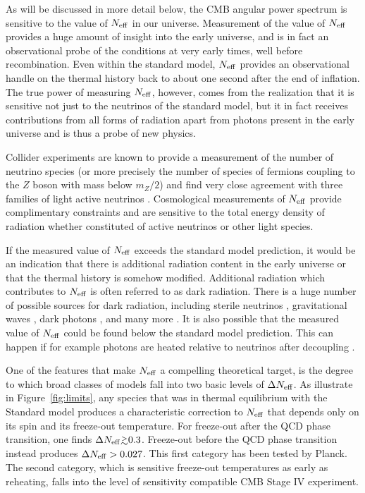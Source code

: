 As will be discussed in more detail below, the CMB angular power spectrum is sensitive to the value of $N_{\rm eff}$ in our universe.  Measurement of the value of $N_{\rm eff}$ provides a huge amount of insight into the early universe, and is in fact an observational probe of the conditions at very early times, well before recombination.  Even within the standard model, $N_{\rm eff}$ provides an observational handle on the thermal history back to about one second after the end of inflation.  The true power of measuring $N_{\rm eff}$, however, comes from the realization that it is sensitive not just to the neutrinos of the standard model, but it in fact receives contributions from all forms of radiation apart from photons present in the early universe and is thus a probe of new physics.

Collider experiments are known to provide a measurement of the number of neutrino species (or more precisely the number of species of fermions coupling to the $Z$ boson with mass below $m_Z/2$) and find very close agreement with three families of light active neutrinos \cite{ALEPH:2005ab}.  Cosmological measurements of $N_{\rm eff}$ provide complimentary constraints and are sensitive to the total energy density of radiation whether constituted of active neutrinos or other light species.

If the measured value of $N_{\rm eff}$ exceeds the standard model prediction, it would be an indication that there is additional radiation content in the early universe or that the thermal history is somehow modified.  Additional radiation which contributes to $N_{\rm eff}$ is often referred to as dark radiation.  There is a huge number of possible sources for dark radiation, including sterile neutrinos \cite{Abazajian:2001nj,Strumia:2006db,Boyarsky:2009ix}, gravitational waves \cite{Boyle:2007zx,Stewart:2007fu,Meerburg:2015zua}, dark photons \cite{Ackerman:mha,Kaplan:2011yj,CyrRacine:2012fz}, and many more \cite{Cadamuro:2010cz,Weinberg:2013kea}.  It is also possible that the measured value of $N_{\rm eff}$ could be found below the standard model prediction.  This can happen if for example photons are heated relative to neutrinos after decoupling \cite{Steigman:2013yua,Boehm:2013jpa}.

One of the features that make $N_{\rm eff}$ a compelling theoretical target, is the degree to which broad classes of models fall into two basic levels of $\Delta N_{\rm eff}$.  As illustrate in Figure~\ref{fig:limits}, any species that was in thermal equilibrium with the Standard model produces a characteristic correction to $N_{\rm eff}$ that depends only on its spin and its freeze-out temperature.  For freeze-out after the QCD phase transition, one finds $\Delta \Neff \gtrsim 0.3$.  Freeze-out before the QCD phase transition instead produces $\Delta N_{\rm eff} > 0.027$.  This first category has been tested by Planck.  The second category, which is sensitive freeze-out temperatures as early as reheating, falls into the level of sensitivity compatible CMB Stage IV experiment.


